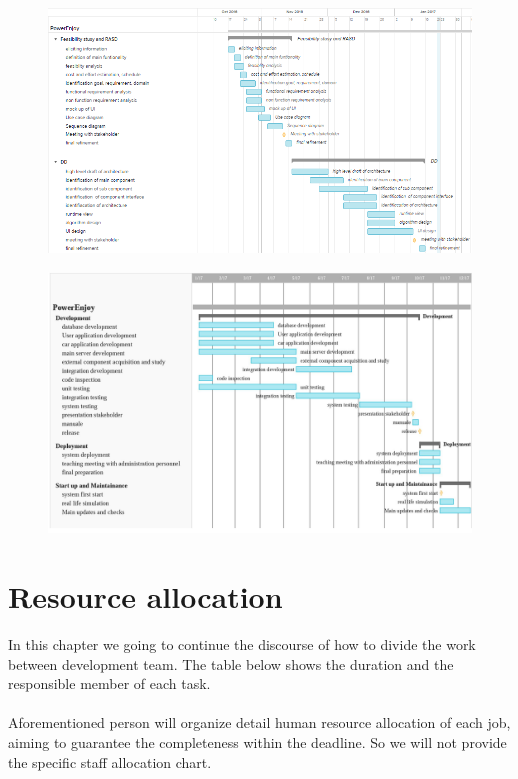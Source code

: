 \documentclass{article}
\begin{document}
\begin{figure}[H]
	\centering
	\includegraphics[width=1.2\textwidth]{schedule1.png} 
\end{figure}

\begin{figure}[H]
	\centering
	\includegraphics[width=1.2\textwidth]{schedule2.png} 
\end{figure}

\newpage
\section{Resource allocation}
In this chapter we going to continue the discourse of how to divide the work between development team. The table below shows the duration and the responsible member of each task.\\ \\Aforementioned person will organize detail human resource allocation of each job, aiming to guarantee the completeness within the deadline. So we will not provide the specific staff allocation chart.
\end{document}
